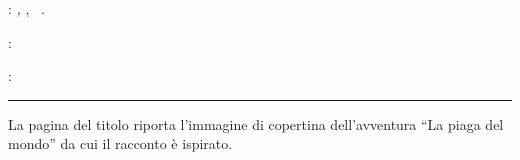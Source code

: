 \thispagestyle{empty}

\hfill

\vfill

\noindent\myName:
\textit{\myTitle,} \mySubTitle,
\textcopyright\ \myTime.

\medskip
{}: \\
\myUrl

\medskip
{}: \\
\mail{\myEmail}

\vspace{1cm}
\hrule
\bigskip

\noindent La pagina del titolo riporta l'immagine di copertina dell'avventura ``La piaga del mondo'' da cui il racconto \`e ispirato.